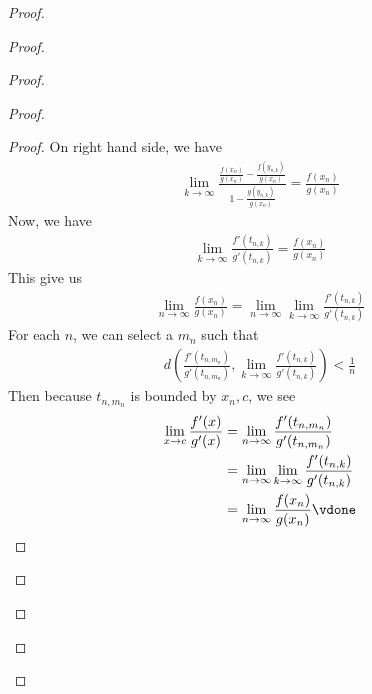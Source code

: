 \documentclass{report}
\begin{document}
\begin{proof}
\begin{proof}
\begin{proof}
\begin{proof}
\begin{proof}
On right hand side, we have 
\begin{align*}
\lim_{k\to \infty} \frac{\frac{f(x_n)}{g(x_n)}-\frac{f(y_{n,k})}{g(x_n)}}{1-\frac{g(y_{n,k})}{g(x_n)}}=\frac{f(x_n)}{g(x_n)}
\end{align*}
Now, we have 
\begin{align*}
\lim_{k \to \infty}\frac{f'(t_{n,k})}{g'(t_{n,k})}=\frac{f(x_n)}{g(x_n)}
\end{align*}
This give us 
\begin{align*}
\lim_{n \to \infty }\frac{f(x_n)}{g(x_n)}=\lim_{n \to \infty}\lim_{k \to \infty}\frac{f'(t_{n,k})}{g'(t_{n,k})}
\end{align*}
For each $n$, we can select a  $m_n$ such that 
\begin{align*}
d(\frac{f'(t_{n,m_n})}{g'(t_{n,m_n})},\lim_{k \to \infty}\frac{f'(t_{n,k})}{g'(t_{n,k})})<\frac{1}{n}
\end{align*}
Then because $t_{n,m_n}$ is bounded by $x_n,c$, we see 
 \begin{align*}
\lim_{x \to c} \frac{f'(x)}{g'(x)}&=\lim_{n \to \infty}\frac{f'(t_{n,m_n})}{g'(t_{n,m_n})}\\
&=\lim_{n \to \infty}\lim_{k \to\infty}\frac{f'(t_{n,k})}{g'(t_{n,k})}\\
&=\lim_{n\to \infty} \frac{f(x_n)}{g(x_n)}\vdone
\end{align*}







\end{proof}

\end{proof}
\end{proof}
\end{proof}
\end{proof}
\end{document}

